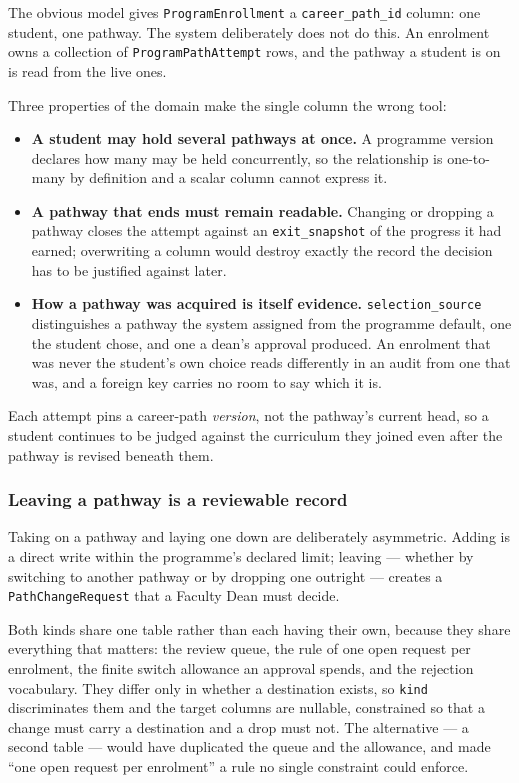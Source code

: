 The obvious model gives \texttt{ProgramEnrollment} a \texttt{career\_path\_id} column: one
student, one pathway. The system deliberately does not do this. An enrolment owns a
collection of \texttt{ProgramPathAttempt} rows, and the pathway a student is on is read from
the live ones.

Three properties of the domain make the single column the wrong tool:

\begin{itemize}
    \item \textbf{A student may hold several pathways at once.} A programme version declares how many may be held concurrently, so the relationship is one-to-many by definition and a scalar column cannot express it.
    \item \textbf{A pathway that ends must remain readable.} Changing or dropping a pathway closes the attempt against an \texttt{exit\_snapshot} of the progress it had earned; overwriting a column would destroy exactly the record the decision has to be justified against later.
    \item \textbf{How a pathway was acquired is itself evidence.} \texttt{selection\_source} distinguishes a pathway the system assigned from the programme default, one the student chose, and one a dean's approval produced. An enrolment that was never the student's own choice reads differently in an audit from one that was, and a foreign key carries no room to say which it is.
\end{itemize}

Each attempt pins a career-path \emph{version}, not the pathway's current head, so a student continues to be judged against the curriculum they joined even after the pathway is revised beneath them.

\subsubsection{Leaving a pathway is a reviewable record}

Taking on a pathway and laying one down are deliberately asymmetric. Adding is a direct write within the programme's declared limit; leaving --- whether by switching to another pathway or by dropping one outright --- creates a \texttt{PathChangeRequest} that a Faculty Dean must decide.

Both kinds share one table rather than each having their own, because they share everything that matters: the review queue, the rule of one open request per enrolment, the finite switch allowance an approval spends, and the rejection vocabulary. They differ only in whether a destination exists, so \texttt{kind} discriminates them and the target columns are nullable, constrained so that a change must carry a destination and a drop must not. The alternative --- a second table --- would have duplicated the queue and the allowance, and made ``one open request per enrolment'' a rule no single constraint could enforce.

